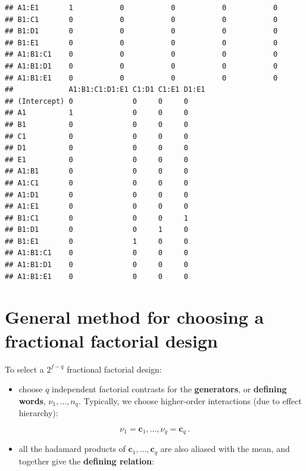 \documentclass[
]{book}
\providecommand{\tightlist}{%
  \setlength{\itemsep}{0pt}\setlength{\parskip}{0pt}}
\theoremstyle{definition}
\theoremstyle{definition}
\theoremstyle{definition}
\theoremstyle{definition}
\theoremstyle{remark}
\begin{document}
\begin{verbatim}
## A1:E1       1           0           0           0           0          
## B1:C1       0           0           0           0           0          
## B1:D1       0           0           0           0           0          
## B1:E1       0           0           0           0           0          
## A1:B1:C1    0           0           0           0           0          
## A1:B1:D1    0           0           0           0           0          
## A1:B1:E1    0           0           0           0           0          
##             A1:B1:C1:D1:E1 C1:D1 C1:E1 D1:E1
## (Intercept) 0              0     0     0    
## A1          1              0     0     0    
## B1          0              0     0     0    
## C1          0              0     0     0    
## D1          0              0     0     0    
## E1          0              0     0     0    
## A1:B1       0              0     0     0    
## A1:C1       0              0     0     0    
## A1:D1       0              0     0     0    
## A1:E1       0              0     0     0    
## B1:C1       0              0     0     1    
## B1:D1       0              0     1     0    
## B1:E1       0              1     0     0    
## A1:B1:C1    0              0     0     0    
## A1:B1:D1    0              0     0     0    
## A1:B1:E1    0              0     0     0
\end{verbatim}

\hypertarget{general-method-for-choosing-a-fractional-factorial-design}{%
\section{General method for choosing a fractional factorial design}\label{general-method-for-choosing-a-fractional-factorial-design}}

To select a \(2^{f-q}\) fractional factorial design:

\begin{itemize}
\tightlist
\item
  choose \(q\) independent factorial contrasts for the \textbf{generators}, or \textbf{defining words}, \(\nu_1,\ldots,n_q\). Typically, we choose higher-order interactions (due to effect hierarchy):
\end{itemize}

\[
\nu_{1}=\boldsymbol{c}_{1},\ldots,\nu_{q} = \boldsymbol{c}_{q}\,.
\]

\begin{itemize}
\tightlist
\item
  all the hadamard products of \(\boldsymbol{c}_{1},\dots,\boldsymbol{c}_{q}\) are also aliased with the mean, and together give the \textbf{defining relation}:
\end{itemize}
\end{document}
